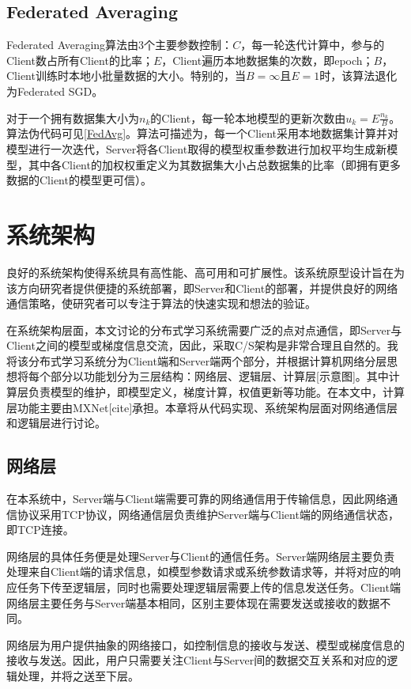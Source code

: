 \documentclass[zihao = -4,cn]{oucart}
\begin{document}
\subsection{Federated Averaging}

Federated Averaging算法由3个主要参数控制：$C$，每一轮迭代计算中，参与的Client数占所有Client的比率；$E$，Client遍历本地数据集的次数，即epoch；$B$，Client训练时本地小批量数据的大小。特别的，当$B=\infty$且$E=1$时，该算法退化为Federated SGD。\par
对于一个拥有数据集大小为$n_k$的Client，每一轮本地模型的更新次数由$u_k = E\frac{n_k}{B}$。算法伪代码可见\ref{FedAvg}。算法可描述为，每一个Client采用本地数据集计算并对模型进行一次迭代，Server将各Client取得的模型权重参数进行加权平均生成新模型，其中各Client的加权权重定义为其数据集大小占总数据集的比率（即拥有更多数据的Client的模型更可信）。
%

\section{系统架构}
良好的系统架构使得系统具有高性能、高可用和可扩展性。该系统原型设计旨在为该方向研究者提供便捷的系统部署，即Server和Client的部署，并提供良好的网络通信策略，使研究者可以专注于算法的快速实现和想法的验证。\par
在系统架构层面，本文讨论的分布式学习系统需要广泛的点对点通信，即Server与Client之间的模型或梯度信息交流，因此，采取C/S架构是非常合理且自然的。我将该分布式学习系统分为Client端和Server端两个部分，并根据计算机网络分层思想将每个部分以功能划分为三层结构：网络层、逻辑层、计算层[示意图]。其中计算层负责模型的维护，即模型定义，梯度计算，权值更新等功能。在本文中，计算层功能主要由MXNet[cite]承担。本章将从代码实现、系统架构层面对网络通信层和逻辑层进行讨论。
\subsection{网络层}
在本系统中，Server端与Client端需要可靠的网络通信用于传输信息，因此网络通信协议采用TCP协议，网络通信层负责维护Server端与Client端的网络通信状态，即TCP连接。\par
网络层的具体任务便是处理Server与Client的通信任务。Server端网络层主要负责处理来自Client端的请求信息，如模型参数请求或系统参数请求等，并将对应的响应任务下传至逻辑层，同时也需要处理逻辑层需要上传的信息发送任务。Client端网络层主要任务与Server端基本相同，区别主要体现在需要发送或接收的数据不同。\par
网络层为用户提供抽象的网络接口，如控制信息的接收与发送、模型或梯度信息的接收与发送。因此，用户只需要关注Client与Server间的数据交互关系和对应的逻辑处理，并将之送至下层。\par
\end{document}
